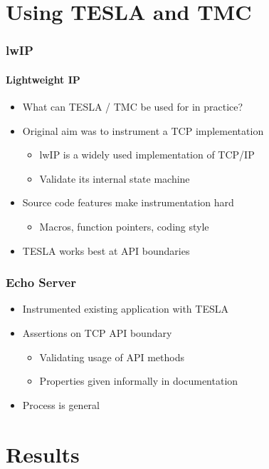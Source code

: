 \documentclass{beamer}
\begin{document}
\section{Using TESLA and TMC}

\begin{frame}
  \frametitle{lwIP}
  \framesubtitle{\textbf{L}ight\textbf{w}eight \textbf{IP}}

  \begin{itemize}
    \item What can TESLA / TMC be used for in practice?
    \item Original aim was to instrument a TCP implementation
      \begin{itemize}
        \item lwIP is a widely used implementation of TCP/IP
        \item Validate its internal state machine
      \end{itemize}
    \item Source code features make instrumentation hard
      \begin{itemize}
        \item Macros, function pointers, coding style
      \end{itemize}
    \item TESLA works best at API boundaries
  \end{itemize}
\end{frame}

\begin{frame}
  \frametitle{Echo Server}

  \begin{itemize}
    \item Instrumented existing application with TESLA
    \item Assertions on TCP API boundary
      \begin{itemize}
        \item Validating usage of API methods
        \item Properties given informally in documentation
      \end{itemize}
    \item Process is general
  \end{itemize}
\end{frame}

\section{Results}
\end{document}
